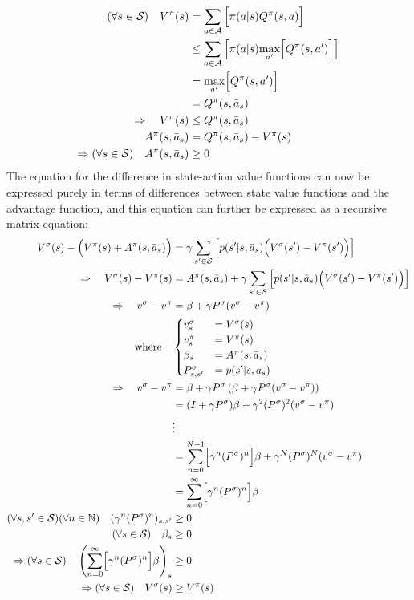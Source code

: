 \begin{align*}
    (\forall s\in\mathcal{S})\quad V^\pi(s) &= \sum_{a\in\mathcal{A}}{\Bigl[ \pi(a\vert s) Q^\pi(s, a) \Bigr]} \\
    &\le \sum_{a\in\mathcal{A}}{\left[ \pi(a\vert s) \underset{a'}{\operatorname{max}}\Bigl[ Q^\pi(s, a') \Bigr] \right]} \\
    &= \underset{a'}{\operatorname{max}}\Bigl[ Q^\pi(s, a') \Bigr] \\
    &= Q^\pi(s, \bar{a}_s) \\
    \Rightarrow\quad V^\pi(s) &\le Q^\pi(s, \bar{a}_s) \\
    A^\pi(s, \bar{a}_s) &= Q^\pi(s, \bar{a}_s) - V^\pi(s) \\
    \Rightarrow(\forall s\in\mathcal{S})\quad A^\pi(s, \bar{a}_s) &\ge 0
\end{align*}
The equation for the difference in state-action value functions can now be expressed purely in terms of differences between state value functions and the advantage function, and this equation can further be expressed as a recursive matrix equation:
\begin{align*}
    V^\sigma(s) - \Bigl(V^\pi(s) + A^\pi(s, \bar{a}_s)\Bigr) &= \gamma\sum_{s'\in\mathcal{S}}{\left[ p(s'\vert s, \bar{a}_s) \Bigl( V^\sigma(s') - V^\pi(s')\Bigr) \right]} \\
    \Rightarrow\quad V^\sigma(s) - V^\pi(s) &= A^\pi(s, \bar{a}_s) + \gamma\sum_{s'\in\mathcal{S}}{\left[ p(s'\vert s, \bar{a}_s) \Bigl( V^\sigma(s') - V^\pi(s')\Bigr) \right]} \\
    \Rightarrow\quad v^\sigma - v^\pi &= \beta + \gamma P^\sigma(v^\sigma - v^\pi) \\
    \text{where} \quad & \begin{cases}
        v^\sigma_s &= V^\sigma(s) \\
        v^\pi_s &= V^\pi(s) \\
        \beta_s &= A^\pi(s, \bar{a}_s) \\
        P^\sigma_{s, s'} &= p(s'\vert s, \bar{a}_s)
    \end{cases} \\
    \Rightarrow\quad v^\sigma - v^\pi &= \beta + \gamma P^\sigma\left(\beta + \gamma P^\sigma(v^\sigma - v^\pi)\right) \\
    &= (I + \gamma P^\sigma)\beta + \gamma^2 (P^\sigma)^2(v^\sigma - v^\pi) \\
    &\vdots \\
    &= \sum_{n=0}^{N-1} \Bigl[ \gamma^n (P^\sigma)^n \Bigr] \beta + \gamma^N (P^\sigma)^N (v^\sigma - v^\pi) \\
    &= \sum_{n=0}^{\infty} \Bigl[ \gamma^n (P^\sigma)^n \Bigr] \beta \\
    (\forall s,s'\in\mathcal{S})(\forall n\in\mathbb{N}) \quad (\gamma^n (P^\sigma)^n)_{s,s'} &\ge 0 \\
    (\forall s\in\mathcal{S}) \quad \beta_s &\ge 0 \\
    \Rightarrow (\forall s\in\mathcal{S}) \quad \left(\sum_{n=0}^{\infty} \Bigl[ \gamma^n (P^\sigma)^n \Bigr] \beta\right)_s &\ge 0 \\
    \Rightarrow (\forall s\in\mathcal{S}) \quad V^\sigma(s) &\ge V^\pi(s)
\end{align*}

